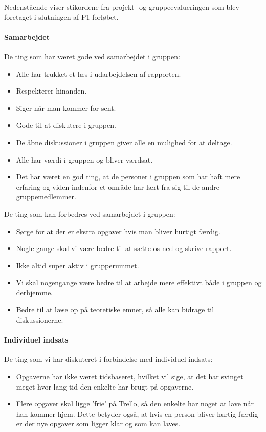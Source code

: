 \documentclass[oneside,a4paper,titlepage]{article}
\begin{document}
Nedenstående viser stikordene fra projekt- og gruppeevalueringen som blev foretaget i slutningen af P1-forløbet.

\paragraph{Samarbejdet}

De ting som har været gode ved samarbejdet i gruppen:
\begin{itemize}
\item Alle har trukket et læs i udarbejdelsen af rapporten. 
\item Respekterer hinanden.
\item Siger når man kommer for sent. 
\item Gode til at diskutere i gruppen. 
\item De åbne diskussioner i gruppen giver alle en mulighed for at deltage. 
\item Alle har værdi i gruppen og bliver værdsat.
\item Det har været en god ting, at de personer i gruppen som har haft mere erfaring og viden indenfor et område har lært fra sig til de andre gruppemedlemmer.
\end{itemize}

De ting som kan forbedres ved samarbejdet i gruppen:
\begin{itemize}
\item Sørge for at der er ekstra opgaver hvis man bliver hurtigt færdig.
\item Nogle gange skal vi være bedre til at sætte os ned og skrive rapport.
\item Ikke altid super aktiv i grupperummet.
\item Vi skal nogengange være bedre til at arbejde mere effektivt både i gruppen og derhjemme. 
\item Bedre til at læse op på teoretiske emner, så alle kan bidrage til diskussionerne.
\end{itemize}

\paragraph{Individuel indsats}

De ting som vi har diskuteret i forbindelse med individuel indsats:

\begin{itemize}
\item Opgaverne har ikke været tidsbaseret, hvilket vil sige, at det har svinget meget hvor lang tid den enkelte har brugt på opgaverne.
\item Flere opgaver skal ligge 'frie' på Trello, så den enkelte har noget at lave når han kommer hjem. Dette betyder også, at hvis en person bliver hurtig færdig er der nye opgaver som ligger klar og som kan laves.
\end{itemize}
\end{document}
